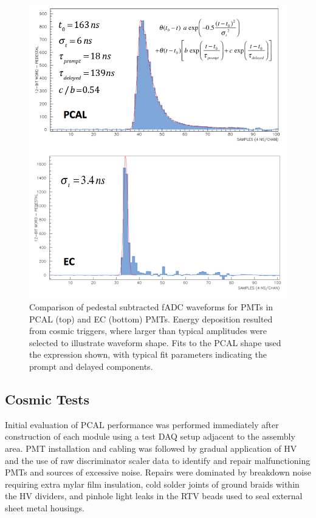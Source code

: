 \begin{figure}[hbt]
\centering
\includegraphics[width=0.95\columnwidth,keepaspectratio]{img/S5_3.png}
\caption{Comparison of pedestal subtracted fADC waveforms for PMTs in PCAL (top) and EC (bottom) PMTs.  Energy deposition resulted from cosmic triggers, where larger than typical amplitudes were selected to illustrate waveform shape. Fits to the PCAL shape used the expression shown, with typical fit parameters indicating the prompt and delayed components.   }
\label{fig:S5_3}
\end{figure}

\subsection{Cosmic Tests} \label{CRT}
Initial evaluation of PCAL performance was performed immediately after construction of each module using a test DAQ setup adjacent to the assembly area.  PMT installation and cabling was followed by gradual application of HV and the use of raw discriminator scaler data to identify and repair malfunctioning PMTs and sources of excessive noise.  Repairs were dominated by breakdown noise requiring extra mylar film insulation, cold solder joints of ground braids within the HV dividers, and pinhole light leaks in the RTV beads used to seal external sheet metal housings. 

